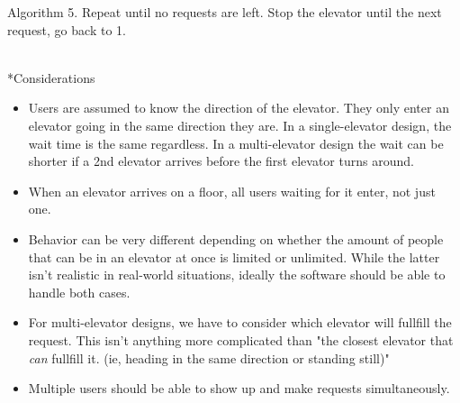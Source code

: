 \documentclass[10pt]{article}
\begin{document}
\begin{section}{Algorithm}
5. Repeat until no requests are left. Stop the elevator until the next request, go back to 1.\\
\\
  \begin{subsection}*{Considerations}
    \begin{itemize}
      \item Users are assumed to know the direction of the elevator. They only enter an elevator going in the same direction they are. In a single-elevator design, the wait time is the same regardless. In a multi-elevator design the wait can be shorter if a 2nd elevator arrives before the first elevator turns around.\\
      \item When an elevator arrives on a floor, all users waiting for it enter, not just one.\\
      \item Behavior can be very different depending on whether the amount of people that can be in an elevator at once is limited or unlimited. While the latter isn't realistic in real-world situations, ideally the software should be able to handle both cases.
      \item For multi-elevator designs, we have to consider which elevator will fullfill the request. This isn't anything more complicated than "the closest elevator that \textit{can} fullfill it. (ie, heading in the same direction or standing still)"
      \item Multiple users should be able to show up and make requests simultaneously.
    \end{itemize}
  \end{subsection}
\end{section}
\end{document}
